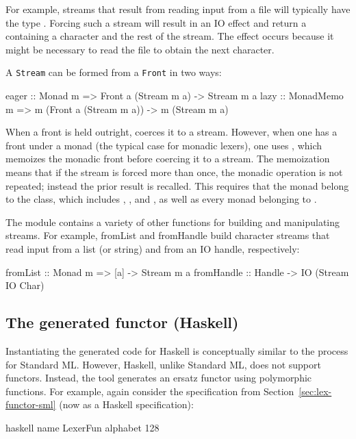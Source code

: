 \documentclass[10pt]{article}
\begin{document}
\begin{strictcode}
\begin{strictcode}
\begin{strictcode}
\begin{strictcode}
For example, streams that result from reading input from a file will
typically have the type .  Forcing such a stream
will result in an IO effect and return a  containing a
character and the rest of the stream.  The effect occurs because it
might be necessary to read the file to obtain the next character.

A {\tt Stream} can be formed from a {\tt Front} in two ways:

\begin{code}
eager :: Monad m => Front a (Stream m a) -> Stream m a
lazy  :: MonadMemo m => m (Front a (Stream m a)) -> m (Stream m a)
\end{code}

When a front is held outright,  coerces it to a stream.
However, when one has a front under a monad (the typical case for
monadic lexers), one uses , which memoizes the monadic front
before coercing it to a stream.  The memoization means that if the
stream is forced more than once, the monadic operation is not
repeated; instead the prior result is recalled.  This requires that
the monad belong to the  class, which includes
, , and , as well as every monad belonging
to .

The  module contains a variety of other functions for
building and manipulating streams.  For example, fromList and
fromHandle build character streams that read input from a list (or
string) and from an IO handle, respectively:

\begin{code}
fromList :: Monad m => [a] -> Stream m a
fromHandle :: Handle -> IO (Stream IO Char)
\end{code}



\subsection{The generated functor (Haskell)}
\label{sec:lex-functor-hs}

Instantiating the generated code for Haskell is conceptually similar
to the process for Standard ML.  However, Haskell, unlike Standard ML,
does not support functors.  Instead, the tool generates an ersatz
functor using polymorphic functions.  For example, again consider the
specification from Section~\ref{sec:lex-functor-sml} (now as a Haskell
specification):

\begin{code}
haskell
name LexerFun
alphabet 128


\end{code}
\end{strictcode}
\end{strictcode}
\end{strictcode}
\end{strictcode}
\end{document}
